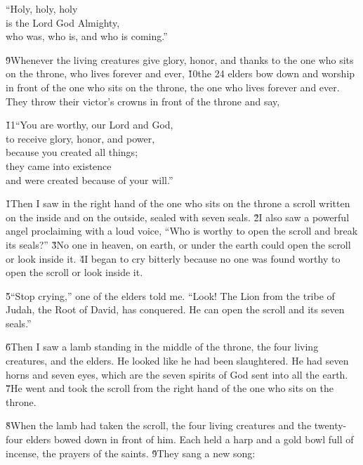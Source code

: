 \begin{poetry}
\poeml ``Holy, holy, holy \\
\poemll    is the Lord God Almighty, \\
\poemlll       who was, who is, and who is coming.''
\end{poetry}

\v{9}Whenever the living creatures give glory, honor, and thanks to the one who sits on the throne, who lives forever and ever, \v{10}the 24 elders bow down and worship in front of the one who sits on the throne, the one who lives forever and ever. They throw their victor's crowns in front of the throne and say,

\begin{poetry}
\poeml \v{11}``You are worthy, our Lord and God, \\
\poemll    to receive glory, honor, and power, \\
\poemlll       because you created all things; \\
\poeml they came into existence \\
\poeml and were created because of your will.''
\end{poetry}

\v{1}Then I saw in the right hand of the one who sits on the throne a scroll written on the inside and on the outside, sealed with seven seals. \v{2}I also saw a powerful angel proclaiming with a loud voice, ``Who is worthy to open the scroll and break its seals?'' \v{3}No one in heaven, on earth, or under the earth could open the scroll or look inside it. \v{4}I began to cry bitterly because no one was found worthy to open the scroll or look inside it.

\v{5}``Stop crying,'' one of the elders told me. ``Look! The Lion from the tribe of Judah, the Root of David, has conquered. He can open the scroll and its seven seals.''

\v{6}Then I saw a lamb standing in the middle of the throne, the four living creatures, and the elders. He looked like he had been slaughtered. He had seven horns and seven eyes, which are the seven spirits of God sent into all the earth. \v{7}He went and took the scroll from the right hand of the one who sits on the throne.

\v{8}When the lamb had taken the scroll, the four living creatures and the twenty-four elders bowed down in front of him. Each held a harp and a gold bowl full of incense, the prayers of the saints. \v{9}They sang a new song:

